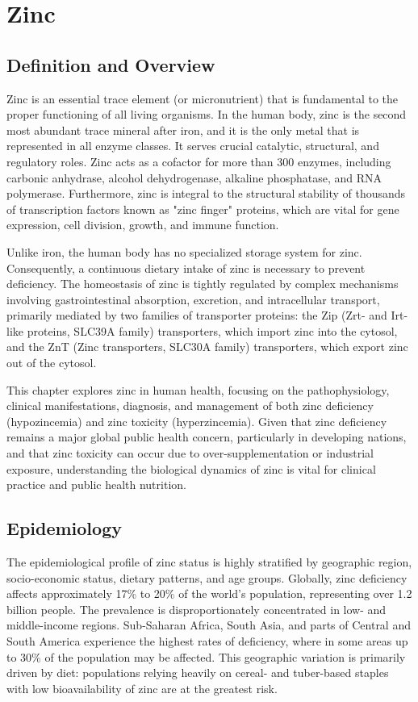 \chapter{Zinc}

\section*{Definition and Overview}
Zinc is an essential trace element (or micronutrient) that is fundamental to the proper functioning of all living organisms. In the human body, zinc is the second most abundant trace mineral after iron, and it is the only metal that is represented in all enzyme classes. It serves crucial catalytic, structural, and regulatory roles. Zinc acts as a cofactor for more than 300 enzymes, including carbonic anhydrase, alcohol dehydrogenase, alkaline phosphatase, and RNA polymerase. Furthermore, zinc is integral to the structural stability of thousands of transcription factors known as "zinc finger" proteins, which are vital for gene expression, cell division, growth, and immune function.

Unlike iron, the human body has no specialized storage system for zinc. Consequently, a continuous dietary intake of zinc is necessary to prevent deficiency. The homeostasis of zinc is tightly regulated by complex mechanisms involving gastrointestinal absorption, excretion, and intracellular transport, primarily mediated by two families of transporter proteins: the Zip (Zrt- and Irt-like proteins, SLC39A family) transporters, which import zinc into the cytosol, and the ZnT (Zinc transporters, SLC30A family) transporters, which export zinc out of the cytosol.

This chapter explores zinc in human health, focusing on the pathophysiology, clinical manifestations, diagnosis, and management of both zinc deficiency (hypozincemia) and zinc toxicity (hyperzincemia). Given that zinc deficiency remains a major global public health concern, particularly in developing nations, and that zinc toxicity can occur due to over-supplementation or industrial exposure, understanding the biological dynamics of zinc is vital for clinical practice and public health nutrition.

\section*{Epidemiology}
The epidemiological profile of zinc status is highly stratified by geographic region, socio-economic status, dietary patterns, and age groups.
Globally, zinc deficiency affects approximately 17\% to 20\% of the world's population, representing over 1.2 billion people. The prevalence is disproportionately concentrated in low- and middle-income regions. Sub-Saharan Africa, South Asia, and parts of Central and South America experience the highest rates of deficiency, where in some areas up to 30\% of the population may be affected. This geographic variation is primarily driven by diet: populations relying heavily on cereal- and tuber-based staples with low bioavailability of zinc are at the greatest risk.

